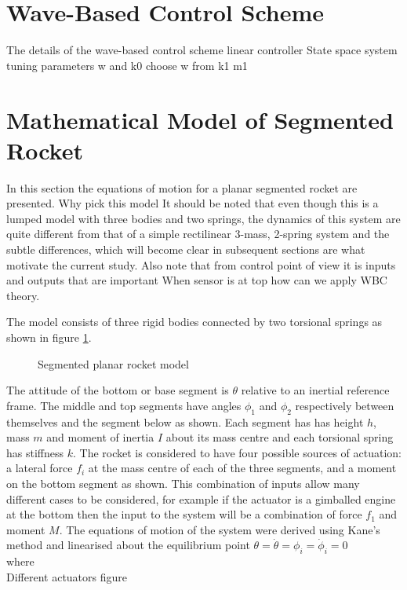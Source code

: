 \documentclass{mbd_fullpaper}
\begin{document}
\section{Wave-Based Control Scheme}
The details of the wave-based control scheme
linear controller
State space system
tuning parameters w and k0
choose w from k1 m1

\section{Mathematical Model of Segmented Rocket}
In this section the equations of motion for a planar segmented rocket are presented.
Why pick this model
It should be noted that even though this is a lumped model with three bodies and two springs, the dynamics of this system are quite different from that of a simple rectilinear 3-mass, 2-spring system and the subtle differences, which will become clear in subsequent sections are what motivate the current study.
Also note that from control point of view it is inputs and outputs that are important
When sensor is at top how can we apply WBC theory.

The model consists of three rigid bodies connected by two torsional springs as shown in figure \ref{fig:rocket-model}.

\begin{figure}[h]
  \begin{center}
    
    \caption{Segmented planar rocket model \label{fig:rocket-model}}
  \end{center}
\end{figure}
The attitude of the bottom or base segment is $\theta$ relative to an inertial reference frame.
The middle and top segments have angles $\phi_1$ and $\phi_2$ respectively between themselves and the segment below as shown.
Each segment has has height $h$, mass $m$ and moment of inertia $I$ about its mass centre and each torsional spring has stiffness $k$.
The rocket is considered to have four possible sources of actuation: a lateral force $f_i$ at the mass centre of each of the three segments, and a moment on the bottom segment as shown.
This combination of inputs allow many different cases to be considered, for example if the actuator is a gimballed engine at the bottom then the input to the system will be a combination of force $f_1$ and moment $M$.
The equations of motion of the system were derived using Kane's method \cite{Kane1980} and linearised about the equilibrium point $\theta=\dot{\theta}=\phi_i=\dot{\phi}_i=0$
\begin{equation}
\end{equation}
where
\begin{equation}

\end{equation}
Different actuators
figure
\end{document}

